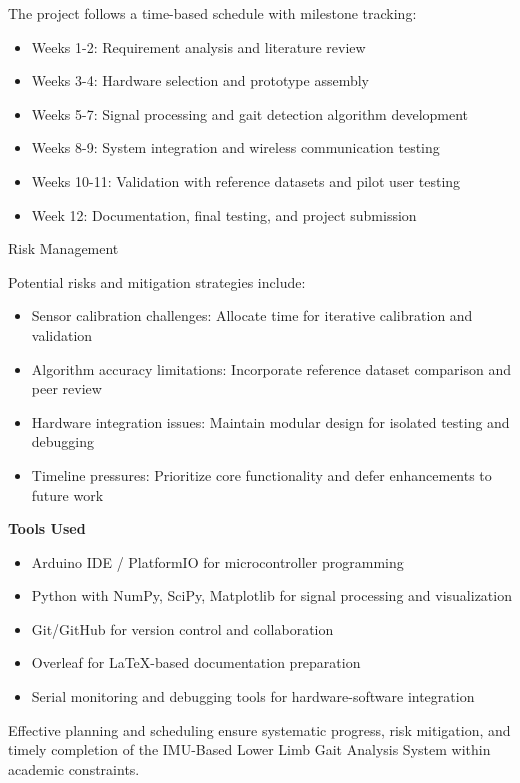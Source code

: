 \documentclass[12pt,a4paper]{report}
\begin{document}
The project follows a time-based schedule with milestone tracking:
\begin{itemize}
\item Weeks 1-2: Requirement analysis and literature review

\item Weeks 3-4: Hardware selection and prototype assembly

\item Weeks 5-7: Signal processing and gait detection algorithm development

\item Weeks 8-9: System integration and wireless communication testing

\item Weeks 10-11: Validation with reference datasets and pilot user testing

\item Week 12: Documentation, final testing, and project submission
\end{itemize}
Risk Management

Potential risks and mitigation strategies include:
\begin{itemize}
\item Sensor calibration challenges: Allocate time for iterative calibration and validation

\item Algorithm accuracy limitations: Incorporate reference dataset comparison and peer review

\item Hardware integration issues: Maintain modular design for isolated testing and debugging

\item Timeline pressures: Prioritize core functionality and defer enhancements to future work
\end{itemize}
\textbf{Tools Used}
\begin{itemize}
\item Arduino IDE / PlatformIO for microcontroller programming

\item Python with NumPy, SciPy, Matplotlib for signal processing and visualization

\item Git/GitHub for version control and collaboration

\item Overleaf for LaTeX-based documentation preparation

\item Serial monitoring and debugging tools for hardware-software integration
\end{itemize}
Effective planning and scheduling ensure systematic progress, risk mitigation, and timely completion of the IMU-Based Lower Limb Gait Analysis System within academic constraints.
\end{document}
